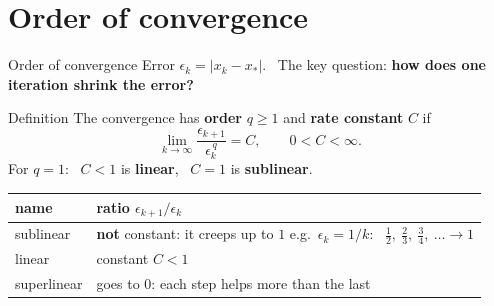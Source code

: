 \documentclass[aspectratio=169]{beamer}
\begin{document}
\section{Order of convergence}

\begin{frame}{Order of convergence}
\small
Error $\epsilon_k = |x_k - x_\ast|$. \ The key question: \textbf{how does one iteration shrink the error?}
\begin{block}{Definition}
The convergence has \textbf{order} $q \ge 1$ and \textbf{rate constant} $C$ if
\[ \lim_{k\to\infty} \frac{\epsilon_{k+1}}{\epsilon_k^{\,q}} = C, \qquad 0 < C < \infty . \]
\footnotesize For $q = 1$: \ $C < 1$ is \textbf{linear}, \ $C = 1$ is \textbf{sublinear}.
\end{block}
\vspace{2pt}
\begin{center}
\small
\renewcommand{\arraystretch}{1.25}
\begin{tabular}{p{2.2cm}p{7.2cm}}
\toprule
name & ratio $\epsilon_{k+1}/\epsilon_k$ \\
\midrule
sublinear & \textbf{not} constant: it creeps up to $1$ \newline e.g.\ $\epsilon_k = 1/k$: \ $\tfrac12,\ \tfrac23,\ \tfrac34,\ \ldots \to 1$ \\
linear & constant $C < 1$ \\
superlinear & goes to $0$: each step helps more than the last \\
\bottomrule
\end{tabular}
\end{center}
\end{frame}
\end{document}
